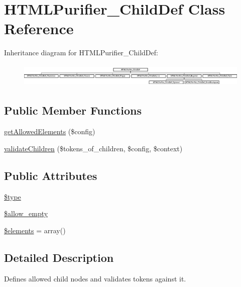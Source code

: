 \hypertarget{classHTMLPurifier__ChildDef}{\section{H\+T\+M\+L\+Purifier\+\_\+\+Child\+Def Class Reference}
\label{classHTMLPurifier__ChildDef}
}
Inheritance diagram for H\+T\+M\+L\+Purifier\+\_\+\+Child\+Def\+:\begin{figure}[H]
\begin{center}
\leavevmode
\includegraphics[height=1.124498cm]{classHTMLPurifier__ChildDef}
\end{center}
\end{figure}
\subsection*{Public Member Functions}
\begin{DoxyCompactItemize}
\item 
\hyperlink{classHTMLPurifier__ChildDef_a39a99af1b943094e40eb70223986e9aa}{get\+Allowed\+Elements} (\$config)
\item 
\hyperlink{classHTMLPurifier__ChildDef_a2ebe8562f033b0a2ec312b39afa3cbfa}{validate\+Children} (\$tokens\+\_\+of\+\_\+children, \$config, \$context)
\end{DoxyCompactItemize}
\subsection*{Public Attributes}
\begin{DoxyCompactItemize}
\item 
\hyperlink{classHTMLPurifier__ChildDef_a3b9246b900d9c5d6107cb82cea62180d}{\$type}
\item 
\hyperlink{classHTMLPurifier__ChildDef_a9f2bccf595a35d8d0f810b8a241a528a}{\$allow\+\_\+empty}
\item 
\hyperlink{classHTMLPurifier__ChildDef_a15ba19c83342e287caccf507e54fdad7}{\$elements} = array()
\end{DoxyCompactItemize}


\subsection{Detailed Description}
Defines allowed child nodes and validates tokens against it. 

